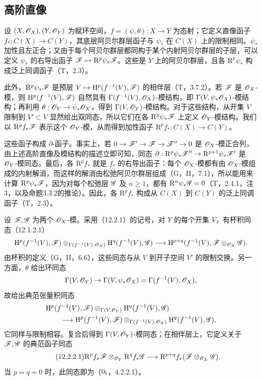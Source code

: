 \subsection{高阶直像}
设 $(X,\mathscr O_X),(Y,\mathscr O_Y)$ 为赋环空间，$f=(\psi,\theta):X\to Y$ 为态射；它定义直像函子 $f_*:C(X)\to C(Y)$，其底层阿贝尔群层函子与 $\psi_*$ 在 $C(X)$ 上的限制相同。$\psi_*$ 加性且左正合；又由于每个阿贝尔群层都同构于某个内射阿贝尔群层的子层，可以定义 $\psi_*$ 的右导出函子 $\mathscr F\mapsto\mathrm R^p\psi_*\mathscr F$。这些是 $Y$ 上的阿贝尔群层，且各 $\mathrm R^p\psi_*$ 构成泛上同调函子（T，2.3）。

此外，$\mathrm R^p\psi_*\mathscr F$ 是预层 $V\mapsto\mathrm H^p(f^{-1}(V),\mathscr F)$ 的相伴层（T，3.7.2）。若 $\mathscr F$ 是 $\mathscr O_X$-模，则 $\mathrm H^p(f^{-1}(V),\mathscr F)$ 自然具有 $\Gamma(f^{-1}(V),\mathscr O_X)$-模结构，即 $\Gamma(V,\psi_*\mathscr O_X)$-模结构；再利用 $\theta:\mathscr O_Y\to\psi_*\mathscr O_X$，得到 $\Gamma(V,\mathscr O_Y)$-模结构。对于这些结构，从开集 $V$ 限制到 $V'\subset V$ 显然给出双同态，所以它们在各 $\mathrm R^p\psi_*\mathscr F$ 上定义 $\mathscr O_Y$-模结构。我们以 $\mathrm R^pf_*\mathscr F$ 表示这个 $\mathscr O_Y$-模，从而得到加性函子 $\mathrm R^pf_*:C(X)\to C(Y)$。

这些函子构成 $\partial$-函子。事实上，若 $0\to\mathscr F'\to\mathscr F\to\mathscr F''\to0$ 是 $\mathscr O_X$-模正合列，由上述高阶直像及模结构的描述立即可知，同态 $\partial:\mathrm R^p\psi_*\mathscr F''\to\mathrm R^{p+1}\psi_*\mathscr F'$ 是 $\mathscr O_Y$-模同态。最后，各 $\mathrm R^pf_*$ 就是 $f_*$ 的右导出函子：每个 $\mathscr O_X$-模都有由 $\mathscr O_X$-模组成的内射解消，而这样的解消由松弛阿贝尔群层组成（G，II，7.1），所以能用来计算 $\mathrm R^p\psi_*\mathscr F$，因为对每个松弛层 $\mathscr G$ 及 $n\geq1$，都有 $\mathrm R^n\psi_*\mathscr G=0$（T，2.4.1，注3，以及命题3.3.2的推论）。因此，各 $\mathrm R^pf_*$ 构成从 $C(X)$ 到 $C(Y)$ 的泛上同调函子（T，2.3）。

设 $\mathscr F,\mathscr G$ 为两个 $\mathscr O_X$-模。采用（12.2.1）的记号，对 $Y$ 的每个开集 $V$，有杯积同态（12.1.2.1）
\[
\mathrm H^p(f^{-1}(V),\mathscr F)\otimes_{\Gamma(f^{-1}(V),\mathscr O_X)}
\mathrm H^q(f^{-1}(V),\mathscr G)
\longrightarrow\mathrm H^{p+q}(f^{-1}(V),\mathscr F\otimes_{\mathscr O_X}\mathscr G).
\]
由杯积的定义（G，II，6.6），这些同态与从 $V$ 到开子空间 $V'$ 的限制交换。另一方面，$\theta$ 给出环同态
\[
\Gamma(V,\mathscr O_Y)\to\Gamma(V,\psi_*\mathscr O_X)=\Gamma(f^{-1}(V),\mathscr O_X),
\]
故给出典范张量积同态
\[
\begin{aligned}
&\mathrm H^p(f^{-1}(V),\mathscr F)\otimes_{\Gamma(V,\mathscr O_Y)}\mathrm H^q(f^{-1}(V),\mathscr G)\\
&\hspace{2em}\longrightarrow
\mathrm H^p(f^{-1}(V),\mathscr F)\otimes_{\Gamma(f^{-1}(V),\mathscr O_X)}\mathrm H^q(f^{-1}(V),\mathscr G),
\end{aligned}
\]
它同样与限制相容。复合后得到 $\Gamma(V,\mathscr O_Y)$-模同态；在相伴层上，它定义关于 $\mathscr F,\mathscr G$ 的典范函子同态
\begin{equation}\tag{12.2.2.1}
\mathrm R^pf_*\mathscr F\otimes_{\mathscr O_Y}\mathrm R^qf_*\mathscr G
\longrightarrow\mathrm R^{p+q}f_*(\mathscr F\otimes_{\mathscr O_X}\mathscr G).
\end{equation}
当 $p=q=0$ 时，此同态即为（$0_{\mathrm I}$，4.2.2.1）。

